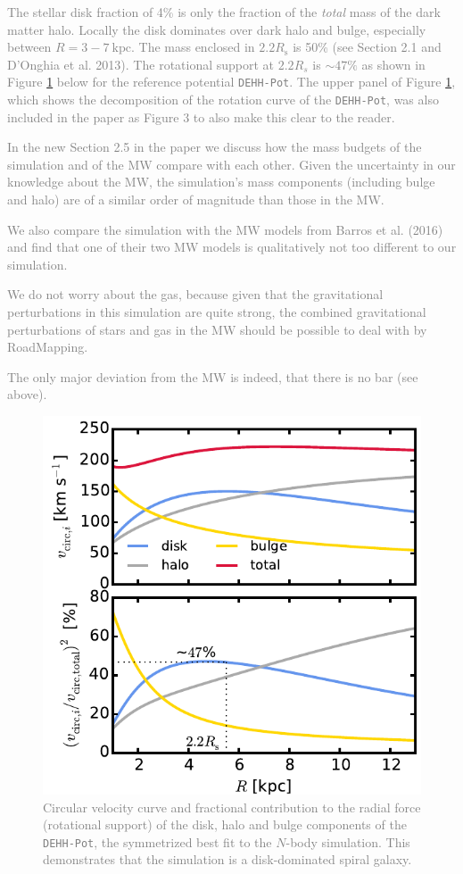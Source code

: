 \documentclass[10pt,a4paper]{article}
\newcommand{\Answer}[1]{\textcolor{Gray}{#1}}
\begin{document}
\Answer{The stellar disk fraction of 4\% is only the fraction of the \emph{total} mass of the dark matter halo. Locally the disk dominates over dark halo and bulge, especially between $R=3-7~\text{kpc}$. The mass enclosed in $2.2R_\text{s}$ is 50\% (see Section 2.1 and D'Onghia et al. 2013). The rotational support at $2.2R_s$ is $\sim47\%$ as shown in Figure \ref{fig:rot_support} below for the reference potential \texttt{DEHH-Pot}. The upper panel of Figure \ref{fig:rot_support}, which shows the decomposition of the rotation curve of the \texttt{DEHH-Pot}, was also included in the paper as Figure 3 to also make this clear to the reader.}

\Answer{In the new Section 2.5 in the paper we discuss how the mass budgets of the simulation and of the MW compare with each other. Given the uncertainty in our knowledge about the MW, the simulation's mass components (including bulge and halo) are of a similar order of magnitude than those in the MW.}

\Answer{We also compare the simulation with the MW models from Barros et al. (2016) and find that one of their two MW models is qualitatively not too different to our simulation.}

\Answer{We do not worry about the gas, because given that the gravitational perturbations in this simulation are quite strong, the combined gravitational perturbations of stars and gas in the MW should be possible to deal with by RoadMapping.}

\Answer{The only major deviation from the MW is indeed, that there is no bar (see above).}

\begin{figure}[!htbp]
\centering
\includegraphics[width=0.7\columnwidth]{fig/plot_vcirc_decomposed.pdf}
\caption{\Answer{Circular velocity curve and fractional contribution to the radial force (rotational support) of the disk, halo and bulge components of the \texttt{DEHH-Pot}, the symmetrized best fit to the $N$-body simulation. This demonstrates that the simulation is a disk-dominated spiral galaxy.}}
\label{fig:rot_support}
\end{figure}
\end{document}

